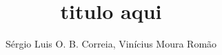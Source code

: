 \documentclass[12pt]{article}
\title{titulo aqui}
\author{Sérgio Luis O. B. Correia, Vinícius Moura Romão}
\begin{document}
 

\maketitle

     
\begin{resumo} 
\end{resumo}












\end{document}
